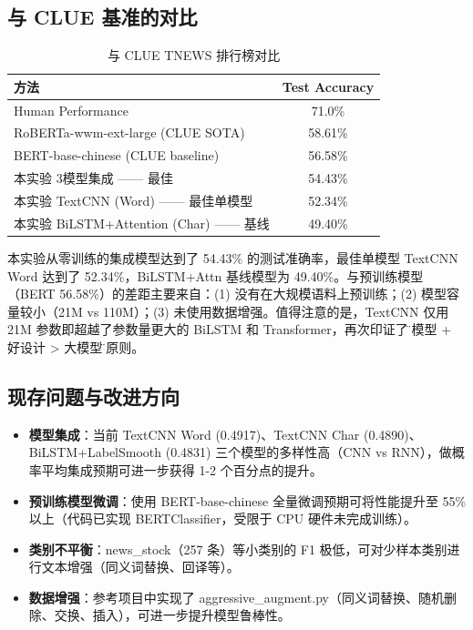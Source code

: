 \subsection{与 CLUE 基准的对比}

\begin{table}[htbp]
\centering
\caption{与 CLUE TNEWS 排行榜对比}
\begin{tabular}{lc}
\hline
方法 & Test Accuracy \\
\hline
Human Performance & 71.0\% \\
RoBERTa-wwm-ext-large (CLUE SOTA) & 58.61\% \\
BERT-base-chinese (CLUE baseline) & 56.58\% \\
本实验 3模型集成 —— 最佳 & 54.43\% \\
本实验 TextCNN (Word) —— 最佳单模型 & 52.34\% \\
本实验 BiLSTM+Attention (Char) —— 基线 & 49.40\% \\
\hline
\end{tabular}
\end{table}

本实验从零训练的集成模型达到了 54.43\% 的测试准确率，最佳单模型 TextCNN Word 达到了 52.34\%，BiLSTM+Attn 基线模型为 49.40\%。与预训练模型（BERT 56.58\%\cite{devlin2018}）的差距主要来自：(1) 没有在大规模语料上预训练；(2) 模型容量较小（21M vs 110M）；(3) 未使用数据增强。值得注意的是，TextCNN 仅用 21M 参数即超越了参数量更大的 BiLSTM 和 Transformer，再次印证了\"小模型 + 好设计 > 大模型\"的原则。

\subsection{现存问题与改进方向}

\begin{itemize}
\item \textbf{模型集成}：当前 TextCNN Word (0.4917)、TextCNN Char (0.4890)、BiLSTM+LabelSmooth (0.4831) 三个模型的多样性高（CNN vs RNN），做概率平均集成预期可进一步获得 1-2 个百分点的提升。
\item \textbf{预训练模型微调}：使用 BERT-base-chinese 全量微调预期可将性能提升至 55\% 以上（代码已实现 BERTClassifier，受限于 CPU 硬件未完成训练）。
\item \textbf{类别不平衡}：news\_stock（257 条）等小类别的 F1 极低，可对少样本类别进行文本增强（同义词替换、回译等）。
\item \textbf{数据增强}：参考项目中实现了 aggressive\_augment.py（同义词替换、随机删除、交换、插入），可进一步提升模型鲁棒性。
\end{itemize}

